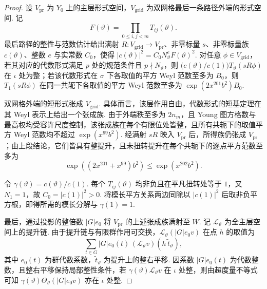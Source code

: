 \begin{proof}
设 $V_{\mathrm{pr}}$ 为 $Y_0$ 上的主层形式空间，$V_{\mathrm{grid}}$ 为双网格最后一条路径外端的形式空间. 记
\[
 F(\vartheta)=\prod_{0\le i,j<m}T_{ij}(\vartheta).
\]
最后路径的整性与范数估计给出满射 $R\colon V_{\mathrm{grid}}\to V_{\mathrm{pr}}$、非零标量 $s$、非零标量族 $c(\vartheta)$、整数 $e$ 与实常数 $C_0$，使得 $|c(\vartheta)|^2=C_0 N_\vartheta^e F(\vartheta)^2$. 对任意 $\phi\in V_{\mathrm{grid}}$，若其对应的代数形式满足 $p$ 处的规范条件且 $p\nmid N_\vartheta$，则 $\bigl(c(\vartheta)/c(1)\bigr)T_\vartheta(sR\phi)$ 在 $\iota$ 处为整；若该代数形式在 $\sigma$ 下各取值的平方 Weyl 范数至多为 $B_0$，则 $T_1(sR\phi)$ 在同一共轭下各取值的平方 Weyl 范数至多为 $\exp(2x^{201}b^2)B_0$.

双网格外端的短形式张成 $V_{\mathrm{grid}}$. 具体而言，该层作用自由，代数形式的短基定理在其 Weyl 表示上给出一个张成族. 由于外端秩至多为 $2n_m$，且 Young 图方格数与最高权均受容许尺度控制，该张成族在每个有限位处皆整，且所有共轭下的取值平方 Weyl 范数均不超过 $\exp(x^{99}b^2)$. 经满射 $sR$ 映入 $V_{\mathrm{pr}}$ 后，所得族仍张成 $V_{\mathrm{pr}}$；由上段结论，它们皆具有整提升，且未扭转提升在每个共轭下的逐点平方范数至多为
\[
 \exp((2x^{201}+x^{99})b^2)\le \exp(x^{202}b^2).
\]

令 $\gamma(\vartheta)=c(\vartheta)/c(1)$. 每个 $T_{ij}(\vartheta)$ 均非负且在平凡扭转处等于 $1$，又 $N_1=1$，故 $C_0=|c(1)|^2>0$. 将模长平方关系两边同除以 $|c(1)|^2$ 后取非负平方根，即得所需的模长分解与 $\gamma(1)=1$.

最后，通过投影的整倍数 $|G|e_0$ 将 $V_{\mathrm{pr}}$ 的上述张成族满射至 $W$. 记 $\mathcal L_\vartheta$ 为全主层空间上的提升链. 由于提升链与有限群作用可交换，$\mathcal L_\vartheta(|G|e_0 v)$ 在点 $h$ 的取值为
\[
 \sum_{t\in G} |G|e_0(t)\,
       (\mathcal L_\vartheta v)(h\,\widetilde t_\vartheta),
\]
其中 $e_0(t)$ 为群代数系数，$\widetilde t_\vartheta$ 为提升上的整右平移. 因系数 $|G|e_0(t)$ 为代数整数，且整右平移保持局部整性条件，若 $\gamma(\vartheta)\mathcal L_\vartheta v$ 在 $\iota$ 处整，则由超度量不等式可知 $\gamma(\vartheta)\Theta_\vartheta(|G|e_0 v)$ 亦在 $\iota$ 处整.


\end{proof}
